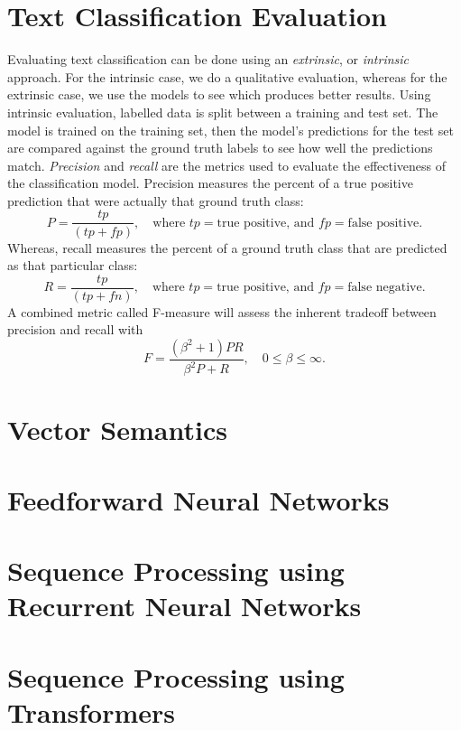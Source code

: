 \documentclass[12pt]{report}
\begin{document}
\section{Text Classification Evaluation}
Evaluating text classification can be done using an \emph{extrinsic}, or
\emph{intrinsic} approach.  For the intrinsic case, we do a
qualitative evaluation, whereas for the extrinsic case, we use the models to see
which produces better results.  Using intrinsic evaluation, labelled data is
split between a training and test set.  The model is trained on the training
set, then the model's predictions for the test set are compared against the
ground truth labels to see how well the predictions match.  \emph{Precision} and
\emph{recall} are the metrics used to evaluate the effectiveness of the
classification model.  Precision measures the percent of a true positive
prediction that were actually that ground truth class:
\[ P = \frac{tp}{(tp + fp)},\quad\text{where }tp = \text{true positive, and }fp
= \text{false positive}. \]
Whereas, recall measures the percent of a ground truth class that are predicted
as that particular class:
\[ R = \frac{tp}{(tp + fn)},\quad\text{where }tp = \text{true positive, and }fp
= \text{false negative}. \]
A combined metric called F-measure will assess the inherent tradeoff between
precision and recall with
\[ F = \frac{(\beta^2 + 1)PR}{\beta^2P + R},\quad 0\leq \beta\leq\infty. \]

\section{Vector Semantics}

\section{Feedforward Neural Networks}

\section{Sequence Processing using Recurrent Neural Networks}

\section{Sequence Processing using Transformers}
\end{document}
